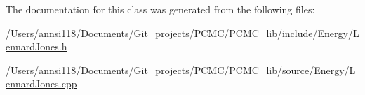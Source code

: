 The documentation for this class was generated from the following files\+:\begin{DoxyCompactItemize}
\item 
/\+Users/annsi118/\+Documents/\+Git\+\_\+projects/\+P\+C\+M\+C/\+P\+C\+M\+C\+\_\+lib/include/\+Energy/\hyperlink{_lennard_jones_8h}{Lennard\+Jones.\+h}\item 
/\+Users/annsi118/\+Documents/\+Git\+\_\+projects/\+P\+C\+M\+C/\+P\+C\+M\+C\+\_\+lib/source/\+Energy/\hyperlink{_lennard_jones_8cpp}{Lennard\+Jones.\+cpp}\end{DoxyCompactItemize}
